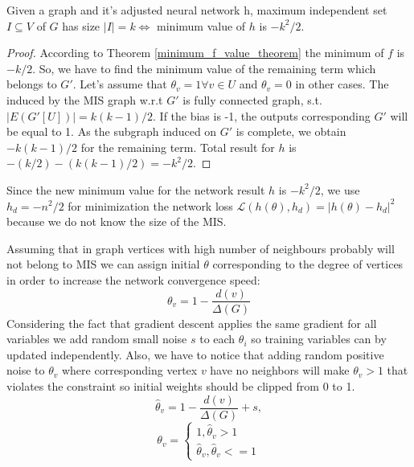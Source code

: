 \begin{theorem}
\label{minimum_h_value_theorem}
Given a graph \graphG and it's adjusted neural network h, maximum independent set $I \subseteq V$ of $G$ has size $|I| = k \iff$ minimum value of $h$ is $-k^2/2$.
\end{theorem}
\begin{proof}
According to Theorem \ref{minimum_f_value_theorem} the minimum of $f$ is $-k/2$. So, we have to find the minimum value of the remaining term which belongs to $G'$. Let's assume that $\theta_v = 1 \forall v \in U$ and $\theta_v = 0$ in other cases. The induced by the MIS graph w.r.t $G'$ is fully connected graph, s.t. $|E(G'[U])|=k(k-1)/2$. If the bias is -1, the outputs corresponding $G'$ will be equal to 1. As the subgraph induced on $G'$ is complete, we obtain $-k(k-1)/2$ for the remaining term. Total result for $h$ is $-(k/2)-(k(k-1)/2)=-k^2/2$.
\end{proof}

Since the new minimum value for the network result $h$ is $-k^2/2$, we use $h_d=-n^2/2$ for minimization the network loss $\mathcal{L}(h(\theta),h_d)=|h(\theta)-h_d|^2$ because we do not know the size of the MIS.

Assuming that in graph \graphG vertices with high number of neighbours probably will not belong to MIS we can assign initial $\theta$ corresponding to the degree of vertices in order to increase the network convergence speed:
\begin{equation}
    \theta_v = 1 - \frac{d(v)}{\Delta(G)}
\end{equation}
Considering the fact that gradient descent applies the same gradient for all variables we add random small noise $s$ to each $\theta_i$ so training variables can by updated independently. Also, we have to notice that adding random positive noise to $\theta_v$ where corresponding vertex $v$ have no neighbors will make $\theta_v > 1$ that violates the constraint so initial weights should be clipped from 0 to 1.
\begin{equation} \label{theta}
    \hat{\theta}_v = 1 - \frac{d(v)}{\Delta(G)} + s, 
\end{equation}
\begin{equation*}
\theta_v = 
\begin{cases}
    1, \hat{\theta}_v > 1 \\
    \hat{\theta}_v, \hat{\theta}_v <=1
\end{cases}
\end{equation*}

